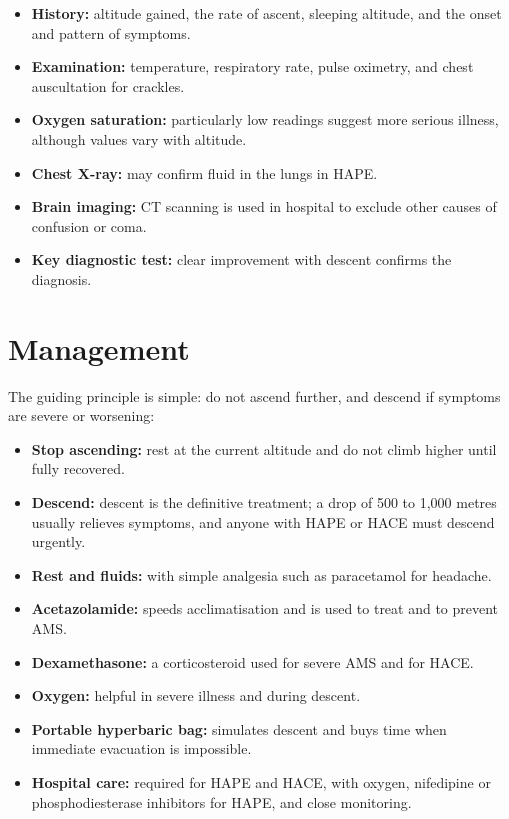 \begin{itemize}
    \item \textbf{History:} altitude gained, the rate of ascent, sleeping altitude, and the onset and pattern of symptoms.
    \item \textbf{Examination:} temperature, respiratory rate, pulse oximetry, and chest auscultation for crackles.
    \item \textbf{Oxygen saturation:} particularly low readings suggest more serious illness, although values vary with altitude.
    \item \textbf{Chest X-ray:} may confirm fluid in the lungs in HAPE.
    \item \textbf{Brain imaging:} CT scanning is used in hospital to exclude other causes of confusion or coma.
    \item \textbf{Key diagnostic test:} clear improvement with descent confirms the diagnosis.
\end{itemize}

\section*{Management}
The guiding principle is simple: do not ascend further, and descend if symptoms are severe or worsening:

\begin{itemize}
    \item \textbf{Stop ascending:} rest at the current altitude and do not climb higher until fully recovered.
    \item \textbf{Descend:} descent is the definitive treatment; a drop of 500 to 1,000 metres usually relieves symptoms, and anyone with HAPE or HACE must descend urgently.
    \item \textbf{Rest and fluids:} with simple analgesia such as paracetamol for headache.
    \item \textbf{Acetazolamide:} speeds acclimatisation and is used to treat and to prevent AMS.
    \item \textbf{Dexamethasone:} a corticosteroid used for severe AMS and for HACE.
    \item \textbf{Oxygen:} helpful in severe illness and during descent.
    \item \textbf{Portable hyperbaric bag:} simulates descent and buys time when immediate evacuation is impossible.
    \item \textbf{Hospital care:} required for HAPE and HACE, with oxygen, nifedipine or phosphodiesterase inhibitors for HAPE, and close monitoring.
\end{itemize}

